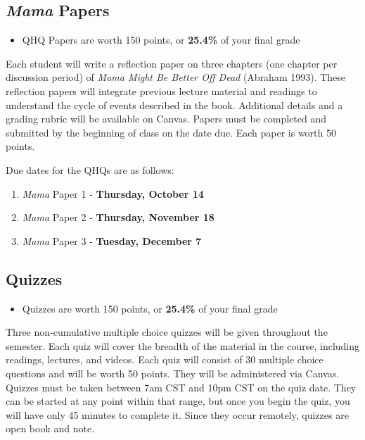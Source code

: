 \documentclass[
]{book}
\providecommand{\tightlist}{%
  \setlength{\itemsep}{0pt}\setlength{\parskip}{0pt}}
\newenvironment{rmdblock}[1]
  {\begin{shaded*}
  \begin{itemize}
  \renewcommand{\labelitemi}{
    \raisebox{-.7\height}[0pt][0pt]{
      {\setkeys{Gin}{width=3em,keepaspectratio}\texttt{[image: images/\#1]}}
    }
  }
  \item
  }
  {
  \end{itemize}
  \end{shaded*}
  }
\newenvironment{rmdtip}
  {\begin{rmdblock}{tip}}
  {\end{rmdblock}}
\begin{document}
\hypertarget{mama-papers}{%
\subsection{\texorpdfstring{\emph{Mama} Papers}{Mama Papers}}\label{mama-papers}}

\begin{rmdtip}
QHQ Papers are worth 150 points, or \textbf{25.4\%} of your final grade
\end{rmdtip}

Each student will write a reflection paper on three chapters (one chapter per discussion period) of \emph{Mama Might Be Better Off Dead} (Abraham 1993). These reflection papers will integrate previous lecture material and readings to understand the cycle of events described in the book. Additional details and a grading rubric will be available on Canvas. Papers must be completed and submitted by the beginning of class on the date due. Each paper is worth 50 points.

Due dates for the QHQs are as follows:

\begin{enumerate}
\def\labelenumi{\arabic{enumi}.}
\tightlist
\item
  \emph{Mama} Paper 1 - \textbf{Thursday, October 14}
\item
  \emph{Mama} Paper 2 - \textbf{Thursday, November 18}
\item
  \emph{Mama} Paper 3 - \textbf{Tuesday, December 7}
\end{enumerate}

\hypertarget{quizzes}{%
\subsection{Quizzes}\label{quizzes}}

\begin{rmdtip}
Quizzes are worth 150 points, or \textbf{25.4\%} of your final grade
\end{rmdtip}

Three non-cumulative multiple choice quizzes will be given throughout the semester. Each quiz will cover the breadth of the material in the course, including readings, lectures, and videos. Each quiz will consist of 30 multiple choice questions and will be worth 50 points. They will be administered via Canvas. Quizzes must be taken between 7am CST and 10pm CST on the quiz date. They can be started at any point within that range, but once you begin the quiz, you will have only 45 minutes to complete it. Since they occur remotely, quizzes are open book and note.
\end{document}
